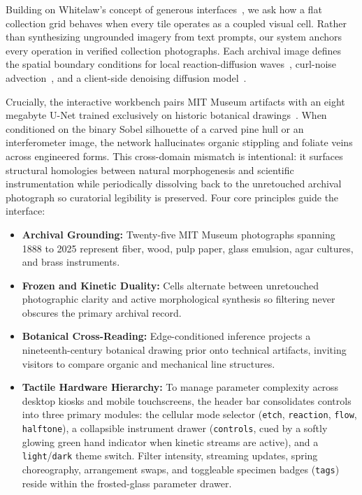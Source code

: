 \documentclass[journal,compsoc]{IEEEtran}
\begin{document}
Building on Whitelaw's concept of generous interfaces~\cite{whitelaw2015}, we ask how a flat collection grid behaves when every tile operates as a coupled visual cell. Rather than synthesizing ungrounded imagery from text prompts, our system anchors every operation in verified collection photographs. Each archival image defines the spatial boundary conditions for local reaction-diffusion waves~\cite{turing1952,pearson1993}, curl-noise advection~\cite{bridson2007}, and a client-side denoising diffusion model~\cite{ho2020,bohan2023,levin2026}.

Crucially, the interactive workbench pairs MIT Museum artifacts with an eight megabyte U-Net trained exclusively on historic botanical drawings~\cite{bohan2023}. When conditioned on the binary Sobel silhouette of a carved pine hull or an interferometer image, the network hallucinates organic stippling and foliate veins across engineered forms. This cross-domain mismatch is intentional: it surfaces structural homologies between natural morphogenesis and scientific instrumentation while periodically dissolving back to the unretouched archival photograph so curatorial legibility is preserved. Four core principles guide the interface:
\begin{itemize}
  \item \textbf{Archival Grounding:} Twenty-five MIT Museum photographs spanning 1888 to 2025 represent fiber, wood, pulp paper, glass emulsion, agar cultures, and brass instruments.
  \item \textbf{Frozen and Kinetic Duality:} Cells alternate between unretouched photographic clarity and active morphological synthesis so filtering never obscures the primary archival record.
  \item \textbf{Botanical Cross-Reading:} Edge-conditioned inference projects a nineteenth-century botanical drawing prior onto technical artifacts, inviting visitors to compare organic and mechanical line structures.
  \item \textbf{Tactile Hardware Hierarchy:} To manage parameter complexity across desktop kiosks and mobile touchscreens, the header bar consolidates controls into three primary modules: the cellular mode selector (\texttt{etch}, \texttt{reaction}, \texttt{flow}, \texttt{halftone}), a collapsible instrument drawer (\texttt{controls}, cued by a softly glowing green hand indicator when kinetic streams are active), and a \texttt{light}/\texttt{dark} theme switch. Filter intensity, streaming updates, spring choreography, arrangement swaps, and toggleable specimen badges (\texttt{tags}) reside within the frosted-glass parameter drawer.
\end{itemize}
\end{document}
